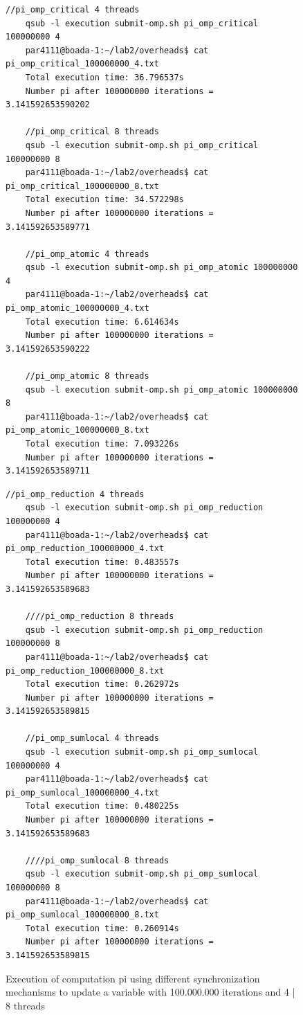 \documentclass[12]{article}
\begin{document}
\begin{figure}[H]
\begin{lstlisting}[frame=single]
    //pi_omp_critical 4 threads
    qsub -l execution submit-omp.sh pi_omp_critical 100000000 4
    par4111@boada-1:~/lab2/overheads$ cat pi_omp_critical_100000000_4.txt 
    Total execution time: 36.796537s
    Number pi after 100000000 iterations = 3.141592653590202

    //pi_omp_critical 8 threads
    qsub -l execution submit-omp.sh pi_omp_critical 100000000 8
    par4111@boada-1:~/lab2/overheads$ cat pi_omp_critical_100000000_8.txt 
    Total execution time: 34.572298s
    Number pi after 100000000 iterations = 3.141592653589771

    //pi_omp_atomic 4 threads
    qsub -l execution submit-omp.sh pi_omp_atomic 100000000 4
    par4111@boada-1:~/lab2/overheads$ cat pi_omp_atomic_100000000_4.txt 
    Total execution time: 6.614634s
    Number pi after 100000000 iterations = 3.141592653590222

    //pi_omp_atomic 8 threads
    qsub -l execution submit-omp.sh pi_omp_atomic 100000000 8
    par4111@boada-1:~/lab2/overheads$ cat pi_omp_atomic_100000000_8.txt 
    Total execution time: 7.093226s
    Number pi after 100000000 iterations = 3.141592653589711
\end{lstlisting}
\end{figure}
\begin{figure}[H]
\begin{lstlisting}[frame=single]
    //pi_omp_reduction 4 threads
    qsub -l execution submit-omp.sh pi_omp_reduction 100000000 4
    par4111@boada-1:~/lab2/overheads$ cat pi_omp_reduction_100000000_4.txt 
    Total execution time: 0.483557s
    Number pi after 100000000 iterations = 3.141592653589683

    ////pi_omp_reduction 8 threads
    qsub -l execution submit-omp.sh pi_omp_reduction 100000000 8
    par4111@boada-1:~/lab2/overheads$ cat pi_omp_reduction_100000000_8.txt 
    Total execution time: 0.262972s
    Number pi after 100000000 iterations = 3.141592653589815

    //pi_omp_sumlocal 4 threads
    qsub -l execution submit-omp.sh pi_omp_sumlocal 100000000 4
    par4111@boada-1:~/lab2/overheads$ cat pi_omp_sumlocal_100000000_4.txt 
    Total execution time: 0.480225s
    Number pi after 100000000 iterations = 3.141592653589683

    ////pi_omp_sumlocal 8 threads
    qsub -l execution submit-omp.sh pi_omp_sumlocal 100000000 8
    par4111@boada-1:~/lab2/overheads$ cat pi_omp_sumlocal_100000000_8.txt 
    Total execution time: 0.260914s
    Number pi after 100000000 iterations = 3.141592653589815
\end{lstlisting}
\caption{Execution of computation pi using different synchronization mechanisms to update a variable with 100.000.000 iterations and 4 | 8  threads}
\label{overheadsComputation}
\end{figure}
\end{document}

